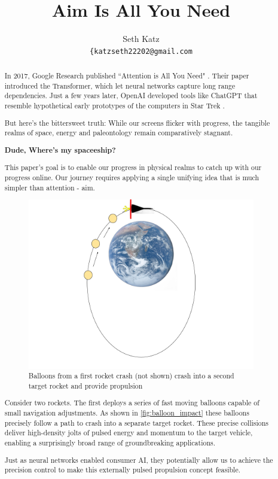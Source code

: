 \documentclass{article}
\title{Aim Is All You Need}
\author{
  Seth Katz \\
  \texttt{\{katzseth22202@gmail.com} \\
}
\begin{document}
\maketitle

\begin{abstract}\label{sec:abstract}
 In 2017, Google Research published ``Attention is All You Need" \cite{vaswani2023attentionneed}.  Their paper introduced the Transformer, which let neural networks capture long range dependencies.   Just a few years later, OpenAI developed tools like ChatGPT \cite{chatgpt} that resemble hypothetical early prototypes of the computers in Star Trek \cite{startrek}.

But here's the bittersweet truth:  While our screens flicker with progress, the tangible realms of space, energy and paleontology remain comparatively stagnant.

\textbf{Dude, Where's my spaceeship?}

This paper's goal is to enable our progress in physical realms to catch up with our progress online.  Our journey requires applying a single unifying idea that is much simpler than attention - aim.   \begin{figure}[h]
    \centering
    \includegraphics[width=0.5\linewidth]{images/Starship_Impact_ellipse.png}
    \caption{Balloons from a first rocket crash (not shown) crash into a second target rocket and provide propulsion}
    \label{fig:balloon_impact}
\end{figure}

Consider two rockets.   The first deploys a series of fast moving balloons capable of small navigation adjustments.  As shown in \autoref{fig:balloon_impact} these balloons precisely follow a path to crash  into a separate  target rocket.   These precise collisions deliver high-density jolts of pulsed energy and momentum to the target vehicle, enabling a surprisingly broad range of groundbreaking applications.    

Just as neural networks enabled consumer AI, they potentially allow us to achieve the precision control to make this externally pulsed propulsion concept feasible.


\end{abstract}
\end{document}
